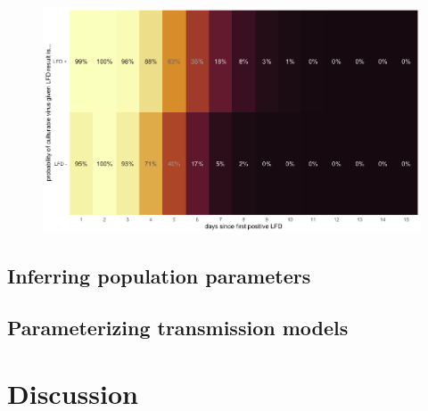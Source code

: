 \documentclass[12pt]{article}
\begin{document}
\begin{figure}[p]
    \centering
    \includegraphics[width=\linewidth]{../3_figures/probability_by_rapid_result.png}
    \caption{}
\end{figure}

\subsection{Inferring population parameters}

\subsection{Parameterizing transmission models}



\section{Discussion}


\clearpage

\end{document}
